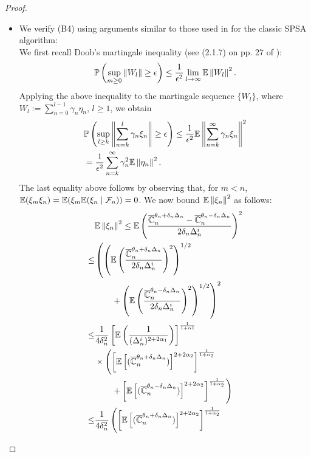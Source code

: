 \begin{proof}
\begin{itemize}
\item We verify (B4) using arguments similar to those used in \cite{spall} for the classic SPSA algorithm:\\
We first recall Doob's martingale inequality (see (2.1.7) on pp. 27 of \cite{kushner-clark}):
\begin{align}
\mathbb{P}\left(  \sup_{m\geq 0}   \left\|W_l\right\| \geq \epsilon  \right) \le \dfrac{1}{\epsilon^2} \lim_{l\rightarrow \infty} \mathbb{E} \left\|W_l\right\|^2. 
\end{align}
Applying the above inequality to the martingale sequence $\{W_l\}$, where  $W_l := \sum_{n=0}^{l-1} \gamma_n \eta_n$, $l\ge 1$, we obtain
\begin{align}
&\mathbb{P}\left(  \sup_{l\geq k}   \left\|\sum_{n=k}^{l} \gamma_n \xi_n\right\| \geq \epsilon  \right) \le \dfrac{1}{\epsilon^2} \mathbb{E} \left\|
\sum_{n=k}^{\infty} \gamma_n \xi_n\right\|^2 \\
&= \dfrac{1}{\epsilon^2} \sum_{n=k}^{\infty} \gamma_n^2 \mathbb{E}\left\| \eta_n\right\|^2. \label{eq:b4}
\end{align}
The last equality above follows by observing that, for $m < n$, $\mathbb{E}(\xi_m \xi_n) = \mathbb{E}(\xi_m \mathbb{E}(\xi_n\mid \mathcal{F}_n))=0$.
We now bound $\mathbb{E}\left\| \xi_n\right\|^2$ as follows:
\begin{align}
&\E\left\| \xi_n\right\|^2\le \E\left(\dfrac{\overline \C_n^{\theta_n + \delta_n \Delta_n} -\overline \C_n^{\theta_n - \delta_n \Delta_n}}{2 \delta_n \Delta_n^i}\right)^2 \label{eq:mi}\\
\le &\left(\left(\E\left(\dfrac{\overline \C_n^{\theta_n + \delta_n \Delta_n}}{2 \delta_n \Delta_n^i}\right)^2\right)^{1/2}\right.\\ 
&\qquad\left.+ \left(\E\left(\dfrac{\overline \C_n^{\theta_n - \delta_n \Delta_n}}{2 \delta_n \Delta_n^i}\right)^2\right)^{1/2}\right)^2 \label{eq:minko}\\
\le &\frac1{4\delta_n^2} \left[ \E\left(\frac1{(\Delta_n^i)^{2+2\alpha_1}}\right) \right]^{\frac{1}{1+\alpha1}} \nonumber\\
& \times \left(\left[\E\left[ (\overline \C_n^{\theta_n + \delta_n \Delta_n})\right]^{2+2\alpha_2}\right]^{\frac{1}{1+\alpha_2}} \right.\\
&\left.\qquad+
\left[\E\left[ (\overline \C_n^{\theta_n - \delta_n \Delta_n})\right]^{2+2\alpha_2}\right]^{\frac{1}{1+\alpha_2}}\right)\label{eq:holder}\\
\le &\frac1{4\delta_n^2} \left(\left[\E\left[ (\overline \C_n^{\theta_n + \delta_n \Delta_n})\right]^{2+2\alpha_2}\right]^{\frac{1}{1+\alpha_2}} \right.\\

\end{align}
\end{itemize}
\end{proof}
